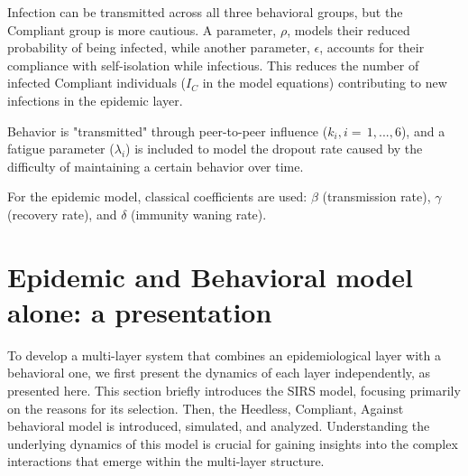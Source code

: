 Infection can be transmitted across all three behavioral groups, but the Compliant group is more cautious. A parameter, $\rho$, models their reduced probability of being infected, while another parameter, $\epsilon$, accounts for their compliance with self-isolation while infectious. This reduces the number of infected Compliant individuals ($I_C$ in the model equations) contributing to new infections in the epidemic layer.

Behavior is "transmitted" through peer-to-peer influence ($k_i, i = \,1,...,6$), and a fatigue parameter ($\lambda_i$) is included to model the dropout rate caused by the difficulty of maintaining a certain behavior over time.

For the epidemic model, classical coefficients are used: $\beta$ (transmission rate), $\gamma$ (recovery rate), and $\delta$ (immunity waning rate).
 



\chapter{Epidemic and Behavioral model alone: a presentation}
\label{ch:model_alone}


To develop a multi-layer system that combines an epidemiological layer with a behavioral one, we first present the dynamics of each layer independently, as presented here. This section briefly introduces the SIRS model, focusing primarily on the reasons for its selection. Then, the Heedless, Compliant, Against behavioral model is introduced, simulated, and analyzed. Understanding the underlying dynamics of this model is crucial for gaining insights into the complex interactions that emerge within the multi-layer structure.


